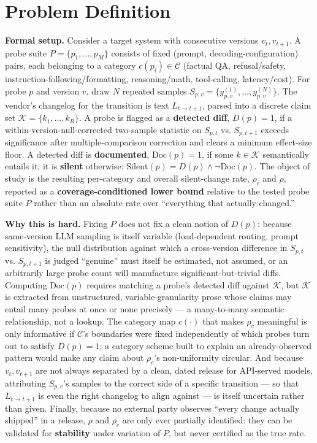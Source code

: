 \documentclass[11pt]{article}
\begin{document}
\section{Problem Definition}

\noindent\textbf{Formal setup.} Consider a target system with consecutive versions $v_t, v_{t+1}$. A probe suite $P = \{p_1,\dots,p_M\}$ consists of fixed (prompt, decoding-configuration) pairs, each belonging to a category $c(p_i) \in \mathcal{C}$ (factual QA, refusal/safety, instruction-following/formatting, reasoning/math, tool-calling, latency/cost). For probe $p$ and version $v$, draw $N$ repeated samples $S_{p,v} = \{y_{p,v}^{(1)}, \dots, y_{p,v}^{(N)}\}$. The vendor's changelog for the transition is text $L_{t\to t+1}$, parsed into a discrete claim set $\mathcal{K} = \{k_1,\dots,k_R\}$. A probe is flagged as a \textbf{detected diff}, $D(p)=1$, if a within-version-null-corrected two-sample statistic on $S_{p,t}$ vs. $S_{p,t+1}$ exceeds significance after multiple-comparison correction and clears a minimum effect-size floor. A detected diff is \textbf{documented}, $\mathrm{Doc}(p)=1$, if some $k \in \mathcal{K}$ semantically entails it; it is \textbf{silent} otherwise: $\mathrm{Silent}(p) = D(p) \wedge \neg \mathrm{Doc}(p)$. The object of study is the resulting per-category and overall silent-change rate, $\rho_c$ and $\rho$, reported as a \textbf{coverage-conditioned lower bound} relative to the tested probe suite $P$ rather than an absolute rate over ``everything that actually changed.''

\noindent\textbf{Why this is hard.} Fixing $P$ does not fix a clean notion of $D(p)$: because same-version LLM sampling is itself variable (load-dependent routing, prompt sensitivity), the null distribution against which a cross-version difference in $S_{p,t}$ vs. $S_{p,t+1}$ is judged ``genuine'' must itself be estimated, not assumed, or an arbitrarily large probe count will manufacture significant-but-trivial diffs. Computing $\mathrm{Doc}(p)$ requires matching a probe's detected diff against $\mathcal{K}$, but $\mathcal{K}$ is extracted from unstructured, variable-granularity prose whose claims may entail many probes at once or none precisely --- a many-to-many semantic relationship, not a lookup. The category map $c(\cdot)$ that makes $\rho_c$ meaningful is only informative if $\mathcal{C}$'s boundaries were fixed independently of which probes turn out to satisfy $D(p)=1$; a category scheme built to explain an already-observed pattern would make any claim about $\rho_c$'s non-uniformity circular. And because $v_t, v_{t+1}$ are not always separated by a clean, dated release for API-served models, attributing $S_{p,v}$'s samples to the correct side of a specific transition --- so that $L_{t\to t+1}$ is even the right changelog to align against --- is itself uncertain rather than given. Finally, because no external party observes ``every change actually shipped'' in a release, $\rho$ and $\rho_c$ are only ever partially identified: they can be validated for \textbf{stability} under variation of $P$, but never certified as the true rate.
\end{document}

